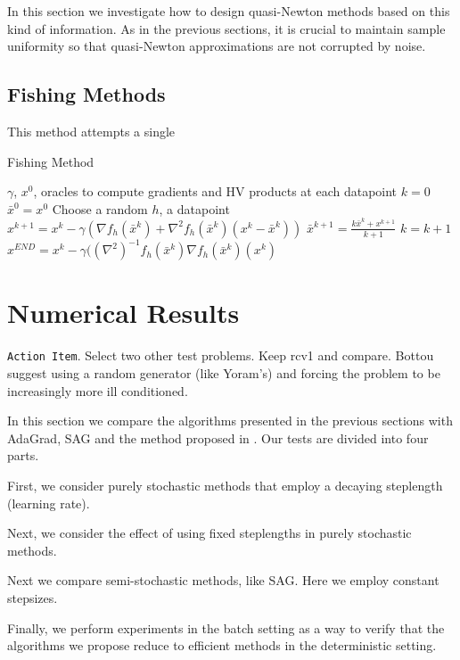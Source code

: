 \documentclass[12pt]{article}
\begin{document}
 In this section we investigate how to design quasi-Newton methods based on this kind of information. As in the previous sections, it is crucial to maintain sample uniformity so that quasi-Newton approximations are not corrupted by noise.
 
 
\subsection{Fishing Methods}   \label{fishing}
This method attempts a single 

\begin{algorithm}[H]
\caption{Fishing Method}
\label{alg1}
\begin{algorithmic}[1]
\REQUIRE  $\gamma$, $x^0$, oracles to compute gradients and HV products at each datapoint
\STATE  $k=0$
\STATE  $\bar{x}^0 = x^0$
\STATE Choose a random $h$, a datapoint
\STATE $x^{k+1} = x^k - \gamma (\nabla f_h(\bar{x}^k) + \nabla^2 f_h(\bar{x}^k) (x^k - \bar{x}^k))$
\STATE $\bar{x}^{k+1} = \frac{k\bar{x}^k +  x^{k+1}}{k+1}$
\STATE $k=k+1$
\ENDWHILE
\STATE $x^{END} = x^k - \gamma ((\nabla^2)^{-1} f_h(\bar{x}^k) \nabla f_h(\bar{x}^k) (x^k)$
\end{algorithmic}
\end{algorithm}
 
 \section{Numerical Results}
\label{numerical}

{\tt Action Item}. Select two other test problems. Keep rcv1 and compare. Bottou suggest using a random generator (like Yoram's) and forcing the problem to be increasingly more ill conditioned.

In this section we compare the algorithms presented in the previous sections with AdaGrad, SAG and the method proposed in \cite{sammy}. Our tests are divided into four parts.

First, we consider purely stochastic methods that employ a decaying steplength (learning rate).

Next, we consider the effect of using fixed steplengths in purely stochastic methods.

Next we compare semi-stochastic methods, like SAG. Here we employ constant stepsizes.

Finally, we perform experiments in the batch setting as a way to verify that the algorithms we propose reduce to efficient methods in the deterministic setting.
\end{document}
